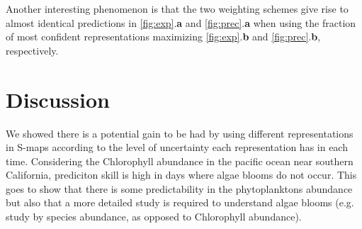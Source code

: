 \documentclass[fleqn,10pt]{wlscirep}
\begin{document}
Another interesting phenomenon is that the two weighting schemes give
rise to almost identical predictions in \ref{fig:exp}.\textbf{a} and
\ref{fig:prec}.\textbf{a} when using the fraction of most confident
representations maximizing \ref{fig:exp}.\textbf{b} and
\ref{fig:prec}.\textbf{b}, respectively.

\section{Discussion}
We showed there is a potential gain to be had by using different
representations in S-maps according to the level of uncertainty each
representation has in each time. Considering the Chlorophyll abundance
in the pacific ocean near southern California, prediciton skill is
high in days where algae blooms do not occur. This goes to show that
there is some predictability in the phytoplanktons abundance but also
that a more detailed study is required to understand algae blooms
(e.g. study by species abundance, as opposed to Chlorophyll
abundance).
\end{document}
